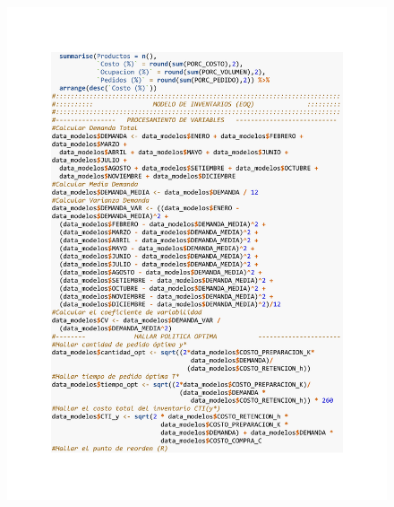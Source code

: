 \begin{figure}[h!]
        \begin{tcolorbox}[colback=white, colframe=black, boxrule=1.5pt, sharp corners=all]
            {\includegraphics[width=\linewidth, height=22cm, trim=2.5cm 2.75cm 2.5cm 2.5cm, clip]{images/script5.pdf}}
        \end{tcolorbox}
\end{figure}

